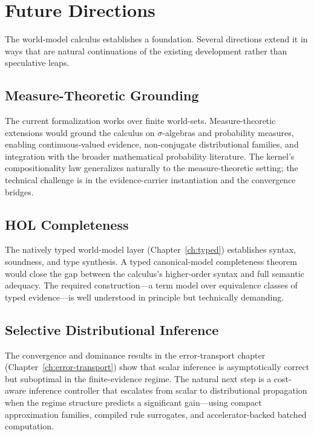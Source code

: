 \chapter{Future Directions}
\label{ch:future}

The world-model calculus establishes a foundation.  Several directions
extend it in ways that are natural continuations of the existing
development rather than speculative leaps.

\section{Measure-Theoretic Grounding}
\label{sec:future-measure}

The current formalization works over finite world-sets.
Measure-theoretic extensions would ground the calculus on
$\sigma$-algebras and probability measures, enabling continuous-valued
evidence, non-conjugate distributional families, and integration with
the broader mathematical probability literature.  The kernel's
compositionality law generalizes naturally to the measure-theoretic
setting; the technical challenge is in the evidence-carrier
instantiation and the convergence bridges.

\section{HOL Completeness}

The natively typed world-model layer
(Chapter~\ref{ch:typed}) establishes syntax, soundness, and type
synthesis.  A typed canonical-model completeness theorem would close
the gap between the calculus's higher-order syntax and full semantic
adequacy.  The required construction---a term model over equivalence
classes of typed evidence---is well understood in principle but
technically demanding.

\section{Selective Distributional Inference}

The convergence and dominance results in the error-transport chapter
(Chapter~\ref{ch:error-transport}) show that scalar inference is
asymptotically correct but suboptimal in the finite-evidence regime.
The natural next step is a cost-aware inference controller that
escalates from scalar to distributional propagation when the regime
structure predicts a significant gain---using compact approximation
families, compiled rule surrogates, and accelerator-backed batched
computation.


